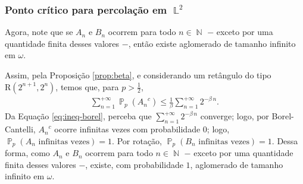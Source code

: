 \documentclass[9pt]{beamer}
\theoremstyle{definition} %
\DeclareMathOperator{\PX}{\mathbb{P}} %
\DeclareMathOperator{\NX}{\mathbb{N}} %
\DeclareMathOperator{\LX}{\mathbb{L}} %
\begin{document}
	\begin{frame}[t]
	\frametitle{Ponto crítico para percolação em $\LX^2$}
		Agora, note que se $A_n$ e $B_n$ ocorrem para todo $n \in \NX$ $-$ exceto por uma quantidade finita desses valores $-$, então existe aglomerado de tamanho infinito em $\omega$.
		
		Assim, pela Proposição \ref{prop:beta}, e considerando um retângulo do tipo $\text{R}(2^{n+1}, 2^n)$, temos que, para $p > \frac{1}{2}$,
		\begin{align}\label{eq:ineq-borel}
		\sum_{n = 1}^{+\infty}\PX_p({A_n}^c) \leq \frac{1}{\beta} \sum_{n = 1}^{+\infty} 2^{-\beta\,n}.
		\end{align}\pause	
		Da Equação \ref{eq:ineq-borel}, perceba que $\sum_{n=1}^{+\infty}2^{-\beta\,n}$ converge; logo, por Borel-Cantelli, ${A_n}^c$ ocorre infinitas vezes com probabilidade $0$; logo, $\PX_p(A_n \text{ infinitas vezes}) = 1$. Por rotação, $\PX_p(B_n \text{ infinitas vezes}) = 1$. Dessa forma, como $A_n$ e $B_n$ ocorrem para todo $n \in \NX$ $-$ exceto por uma quantidade finita desses valores $-$, existe, com probabilidade $1$, aglomerado de tamanho infinito em $\omega$.
	\end{frame}
\end{document}
